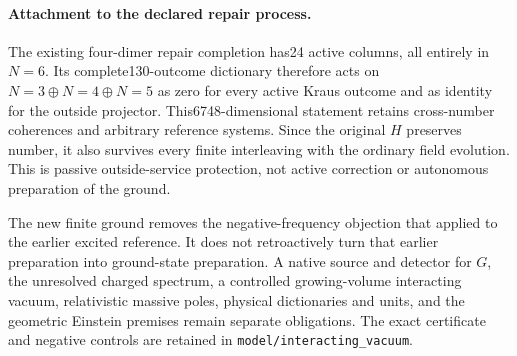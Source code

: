 \paragraph{Attachment to the declared repair process.}
The existing four-dimer repair completion has24 active columns,
all entirely in $N=6$. Its complete130-outcome dictionary therefore
acts on $N=3\oplus N=4\oplus N=5$ as zero for every active Kraus
outcome and as identity for the outside projector. This6748-dimensional
statement retains cross-number coherences and arbitrary reference
systems. Since the original $H$ preserves number, it also survives
every finite interleaving with the ordinary field evolution. This is
passive outside-service protection, not active correction or
autonomous preparation of the ground.

The new finite ground removes the negative-frequency objection that
applied to the earlier excited reference. It does not retroactively
turn that earlier preparation into ground-state preparation. A native
source and detector for $G$, the unresolved charged spectrum, a
controlled growing-volume interacting vacuum, relativistic massive
poles, physical dictionaries and units, and the geometric Einstein
premises remain separate obligations. The exact certificate and
negative controls are retained in \texttt{model/interacting\_vacuum}.

